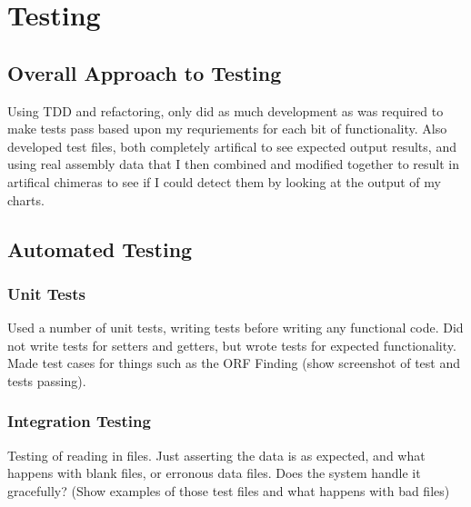 \chapter{Testing}




\section{Overall Approach to Testing}
Using TDD and refactoring, only did as much development as was required to make tests pass based upon my requriements for each bit of functionality. Also developed test files, both completely artifical to see expected output results, and using real assembly data that I then combined and modified together to result in artifical chimeras to see if I could detect them by looking at the output of my charts.

\section{Automated Testing}
\subsection{Unit Tests}
Used a number of unit tests, writing tests before writing any functional code. Did not write tests for setters and getters, but wrote tests for expected functionality. Made test cases for things such as the ORF Finding (show screenshot of test and tests passing).

\subsection{Integration Testing}
Testing of reading in files. Just asserting the data is as expected, and what happens with blank files, or erronous data files. Does the system handle it gracefully? (Show examples of those test files and what happens with bad files)

